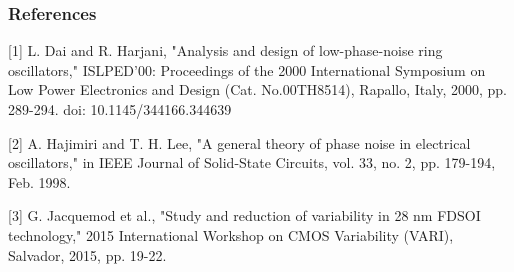 \documentclass[t, screen, aspectratio=43]{beamer}
\begin{document}
\begin{frame}
	\frametitle{References}
		\scriptsize
		[1] L. Dai and R. Harjani, "Analysis and design of low-phase-noise ring oscillators," ISLPED'00: Proceedings of the 2000 International Symposium on Low Power Electronics and Design (Cat. No.00TH8514), Rapallo, Italy, 2000, pp. 289-294. doi: 10.1145/344166.344639\par
		\vspace{0.5em}
		[2] A. Hajimiri and T. H. Lee, "A general theory of phase noise in electrical oscillators," in IEEE Journal of Solid-State Circuits, vol. 33, no. 2, pp. 179-194, Feb. 1998.\par
		\vspace{0.5em}
		[3] G. Jacquemod et al., "Study and reduction of variability in 28 nm FDSOI technology," 2015 International Workshop on CMOS Variability (VARI), Salvador, 2015, pp. 19-22.\par
		\vspace{0.5em}

\end{frame}
\end{document}
